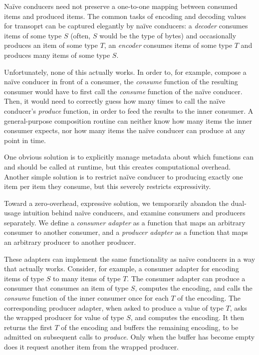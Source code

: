 \documentclass[sigplan,screen,10pt,review]{acmart}
\begin{document}
Naïve conducers need not preserve a one-to-one mapping between consumed items and produced items. The common tasks of encoding and decoding values for transoprt can be captured elegantly by naïve conducers: a \textit{decoder} consumes items of some type $S$ (often, $S$ would be the type of bytes) and occasionally produces an item of some type $T$, an \textit{encoder} consumes items of some type $T$ and produces many items of some type $S$.

Unfortunately, none of this actually works. In order to, for example, compose a naïve conducer in front of a consumer, the \textit{consume} function of the resulting consumer would have to first call the \textit{consume} function of the naïve conducer. Then, it would need to correctly guess how many times to call the naïve conducer's \textit{produce} function, in order to feed the results to the inner consumer. A general-purpose composition routine can neither know how many items the inner consumer expects, nor how many items the naïve conducer can produce at any point in time.

One obvious solution is to explicitly manage metadata about which functions can and should be called at runtime, but this creates computational overhead. Another simple solution is to restrict naïve conducer to producing exactly one item per item they consume, but this severely restricts expressivity.

Toward a zero-overhead, expressive solution, we temporarily abandon the dual-usage intuition behind naïve conducers, and examine consumers and producers separately. We define a \textit{consumer adapter} as a function that maps an arbitrary consumer to another consumer, and a \textit{producer adapter} as a function that maps an arbitrary producer to another producer.

These adapters can implement the same functionality as naïve conducers in a way that actually works. Consider, for example, a consumer adapter for encoding items of type $S$ to many items of type $T$. The consumer adapter can produce a consumer that consumes an item of type $S$, computes the encoding, and calls the \textit{consume} function of the inner consumer once for each $T$ of the encoding. The corresponding producer adapter, when asked to produce a value of type $T$, asks the wrapped producer for value of type $S$, and computes the encoding. It then returns the first $T$ of the encoding and buffers the remaining encoding, to be admitted on subsequent calls to \textit{produce}. Only when the buffer has become empty does it request another item from the wrapped producer.
\end{document}
